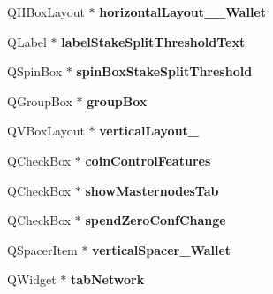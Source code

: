 \begin{DoxyCompactItemize}
\item 
\mbox{\label{class_ui___options_dialog_a478207d695e98c6465bdac17849cd938}} 
Q\+H\+Box\+Layout $\ast$ {\bfseries horizontal\+Layout\+\_\+\_\+\+Wallet}
\item 
\mbox{\label{class_ui___options_dialog_a8d6a0c6a127651004f3cfd8d4f815316}} 
Q\+Label $\ast$ {\bfseries label\+Stake\+Split\+Threshold\+Text}
\item 
\mbox{\label{class_ui___options_dialog_ab99f8a7e8502e9bfd9bb9526d733dbd2}} 
Q\+Spin\+Box $\ast$ {\bfseries spin\+Box\+Stake\+Split\+Threshold}
\item 
\mbox{\label{class_ui___options_dialog_a826046128cd142ad3c0587617472d2da}} 
Q\+Group\+Box $\ast$ {\bfseries group\+Box}
\item 
\mbox{\label{class_ui___options_dialog_a3d13d544bc6091bc2c3bd282edc93c76}} 
Q\+V\+Box\+Layout $\ast$ {\bfseries vertical\+Layout\+\_}
\item 
\mbox{\label{class_ui___options_dialog_a6967e9a0d403178211709b23439d0baf}} 
Q\+Check\+Box $\ast$ {\bfseries coin\+Control\+Features}
\item 
\mbox{\label{class_ui___options_dialog_a63fcebc91d88129a39ab5edc0448a79c}} 
Q\+Check\+Box $\ast$ {\bfseries show\+Masternodes\+Tab}
\item 
\mbox{\label{class_ui___options_dialog_ab88a543898e5e0b54e1b2005691e190b}} 
Q\+Check\+Box $\ast$ {\bfseries spend\+Zero\+Conf\+Change}
\item 
\mbox{\label{class_ui___options_dialog_adcf7b25607d7ff39ae9f639e0fc5f9c8}} 
Q\+Spacer\+Item $\ast$ {\bfseries vertical\+Spacer\+\_\+\+Wallet}
\item 
\mbox{\label{class_ui___options_dialog_acc8bb9a3c78dc8233d8acdaa15af327b}} 
Q\+Widget $\ast$ {\bfseries tab\+Network}
\item 

\end{DoxyCompactItemize}
